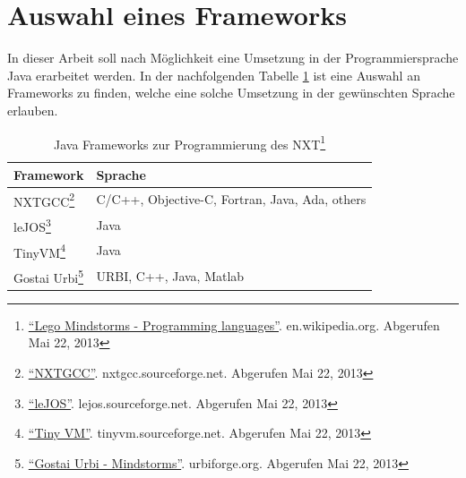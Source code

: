 \section{Auswahl eines Frameworks}

In dieser Arbeit soll nach M\"oglichkeit eine Umsetzung in der Programmiersprache Java erarbeitet werden. In der nachfolgenden Tabelle \ref{tab:NXT_Sprachen} ist eine Auswahl an Frameworks zu finden, welche eine solche Umsetzung in der gew\"unschten Sprache erlauben.
\par\smallskip
\begin{table}[H]
\label{tab:NXT_Sprachen}
\caption[Java Frameworks zur Programmierung des NXT]{ Java Frameworks zur Programmierung des NXT\footnote{\href{http://en.wikipedia.org/wiki/LEGO_Mindstorms\#Programming_languages_2}{\enquote{Lego Mindstorms - Programming languages}}. en.wikipedia.org. Abgerufen Mai 22, 2013}}
\begin{tabular}{|p{5.7cm}|p{9cm}|}
\hline
\textbf{Framework} & \textbf{Sprache} \\
\hline
NXTGCC\footnote{\href{http://nxtgcc.sourceforge.net/}{\enquote{NXTGCC}}. nxtgcc.sourceforge.net. Abgerufen Mai 22, 2013} & C/C++, Objective-C, Fortran, Java, Ada, others \\
\hline
leJOS\footnote{\href{http://lejos.sourceforge.net/}{\enquote{leJOS}}. lejos.sourceforge.net. Abgerufen Mai 22, 2013} & Java \\
\hline
TinyVM\footnote{\href{http://tinyvm.sourceforge.net/}{\enquote{Tiny VM}}. tinyvm.sourceforge.net. Abgerufen Mai 22, 2013} & Java \\
\hline
Gostai Urbi\footnote{\href{http://www.urbiforge.org/index.php/Robots/Mindstorms}{\enquote{Gostai Urbi - Mindstorms}}. urbiforge.org. Abgerufen Mai 22, 2013} & URBI, C++, Java, Matlab \\
\hline
\end{tabular}
\end{table}

\par\smallskip

